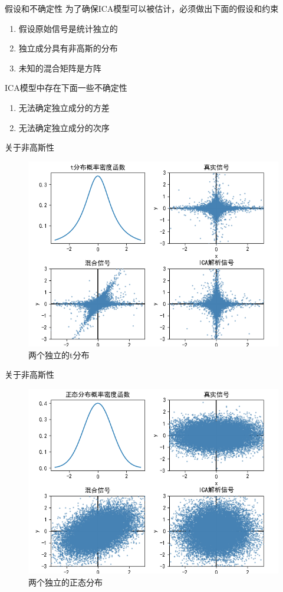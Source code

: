 \documentclass{beamer}
\begin{document}
\begin{frame}{假设和不确定性}
    为了确保ICA模型可以被估计，必须做出下面的假设和约束
    \begin{enumerate}
        \item 假设原始信号是统计独立的
        \item 独立成分具有非高斯的分布
        \item 未知的混合矩阵是方阵
    \end{enumerate}
    
    ICA模型中存在下面一些不确定性
    \begin{enumerate}
        \item 无法确定独立成分的方差
        \item 无法确定独立成分的次序
    \end{enumerate}
\end{frame}

\begin{frame}{关于非高斯性}
\begin{figure}[h]
    \centering
    \includegraphics[width=0.6\linewidth]{figs/t-dist.png}
    \caption{两个独立的t分布}
    \label{fig:t_dist}
\end{figure}
\end{frame}

\begin{frame}{关于非高斯性}
\begin{figure}[h]
    \centering
    \includegraphics[width=0.6\linewidth]{figs/normal-dist.png}
    \caption{两个独立的正态分布}
    \label{fig:normal_dist}
\end{figure}
\end{frame}
\end{document}
